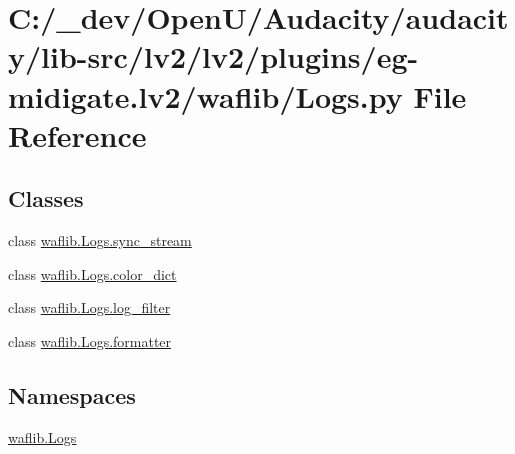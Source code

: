 \hypertarget{lv2_2plugins_2eg-midigate_8lv2_2waflib_2_logs_8py}{}\section{C\+:/\+\_\+dev/\+Open\+U/\+Audacity/audacity/lib-\/src/lv2/lv2/plugins/eg-\/midigate.lv2/waflib/\+Logs.py File Reference}
\label{lv2_2plugins_2eg-midigate_8lv2_2waflib_2_logs_8py}
\subsection*{Classes}
\begin{DoxyCompactItemize}
\item 
class \hyperlink{classwaflib_1_1_logs_1_1sync__stream}{waflib.\+Logs.\+sync\+\_\+stream}
\item 
class \hyperlink{classwaflib_1_1_logs_1_1color__dict}{waflib.\+Logs.\+color\+\_\+dict}
\item 
class \hyperlink{classwaflib_1_1_logs_1_1log__filter}{waflib.\+Logs.\+log\+\_\+filter}
\item 
class \hyperlink{classwaflib_1_1_logs_1_1formatter}{waflib.\+Logs.\+formatter}
\end{DoxyCompactItemize}
\subsection*{Namespaces}
\begin{DoxyCompactItemize}
\item 
 \hyperlink{namespacewaflib_1_1_logs}{waflib.\+Logs}
\end{DoxyCompactItemize}
